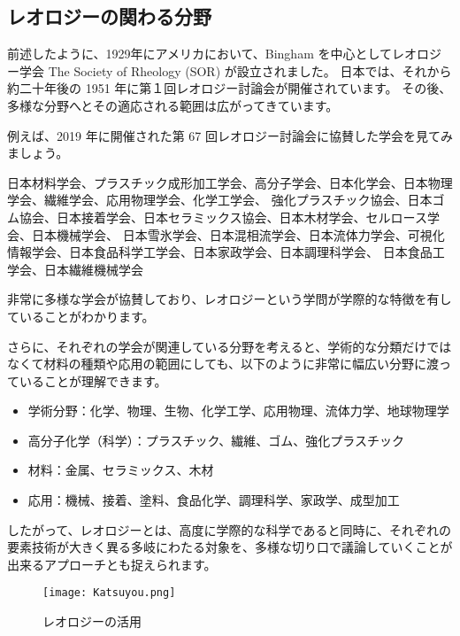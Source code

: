 \documentclass[uplatex,dvipdfmx,a4paper,11pt]{jsreport}
\begin{document}
\subsection{レオロジーの関わる分野}

前述したように、1929年にアメリカにおいて、Bingham を中心としてレオロジー学会 The Society of Rheology (SOR) が設立されました。
日本では、それから約二十年後の 1951 年に第１回レオロジー討論会が開催されています。
その後、多様な分野へとその適応される範囲は広がってきています。

例えば、2019 年に開催された第 67 回レオロジー討論会に協賛した学会を見てみましょう。
\begin{screen}
	日本材料学会、プラスチック成形加工学会、高分子学会、日本化学会、日本物理学会、繊維学会、応用物理学会、化学工学会、
	強化プラスチック協会、日本ゴム協会、日本接着学会、日本セラミックス協会、日本木材学会、セルロース学会、日本機械学会、
	日本雪氷学会、日本混相流学会、日本流体力学会、可視化情報学会、日本食品科学工学会、日本家政学会、日本調理科学会、
	日本食品工学会、日本繊維機械学会
\end{screen}

非常に多様な学会が協賛しており、レオロジーという学問が学際的な特徴を有していることがわかります。

さらに、それぞれの学会が関連している分野を考えると、学術的な分類だけではなくて材料の種類や応用の範囲にしても、以下のように非常に幅広い分野に渡っていることが理解できます。
	\begin{itemize}
	\item
	  学術分野：化学、物理、生物、化学工学、応用物理、流体力学、地球物理学
	\item
	  高分子化学（科学）：プラスチック、繊維、ゴム、強化プラスチック
	\item
	  材料：金属、セラミックス、木材
	\item
	  応用：機械、接着、塗料、食品化学、調理科学、家政学、成型加工
	\end{itemize}
	
したがって、レオロジーとは、高度に学際的な科学であると同時に、それぞれの要素技術が大きく異る多岐にわたる対象を、多様な切り口で議論していくことが出来るアプローチとも捉えられます。

\begin{figure}[htb]
	\begin{center}
		\texttt{[image: Katsuyou.png]}
		\caption{レオロジーの活用}
		\label{katsuyou}
	\end{center}
\end{figure}
\end{document}

